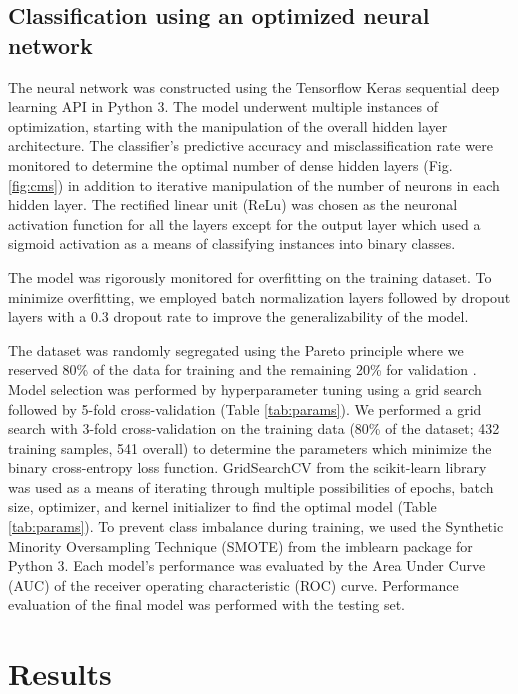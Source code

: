 \documentclass[10pt, letterpaper]{article}
\begin{document}
\begin{multicols*}{2}
\subsection*{Classification using an optimized neural network}
The neural network was constructed using the Tensorflow Keras sequential deep learning API in Python 3. The model underwent multiple instances of optimization, starting with the manipulation of the overall hidden layer architecture. The classifier's predictive accuracy and misclassification rate were monitored to determine the optimal number of dense hidden layers (Fig. \ref{fig:cms}) in addition to iterative manipulation of the number of neurons in each hidden layer. The rectified linear unit (ReLu) was chosen as the neuronal activation function for all the layers except for the output layer which used a sigmoid activation as a means of classifying instances into binary classes.

The model was rigorously monitored for overfitting on the training dataset. To minimize overfitting, we employed batch normalization layers followed by dropout layers with a 0.3 dropout rate to improve the generalizability of the model.

The dataset was randomly segregated using the Pareto principle where we reserved 80\% of the data for training and the remaining 20\% for validation \cite{pareto}. Model selection was performed by hyperparameter tuning using a grid search followed by 5-fold cross-validation (Table \ref{tab:params}). We performed a grid search with 3-fold cross-validation on the training data (80\% of the dataset; 432 training samples, 541 overall) to determine the parameters which minimize the binary cross-entropy loss function. GridSearchCV from the scikit-learn library was used as a means of iterating through multiple possibilities of epochs, batch size, optimizer, and kernel initializer to find the optimal model (Table \ref{tab:params}). To prevent class imbalance during training, we used the Synthetic Minority Oversampling Technique (SMOTE) from the imblearn package for Python 3. Each model’s performance was evaluated by the Area Under Curve (AUC) of the receiver operating characteristic (ROC) curve. Performance evaluation of the final model was performed with the testing set.


\section{Results}


\end{multicols*}
\end{document}
